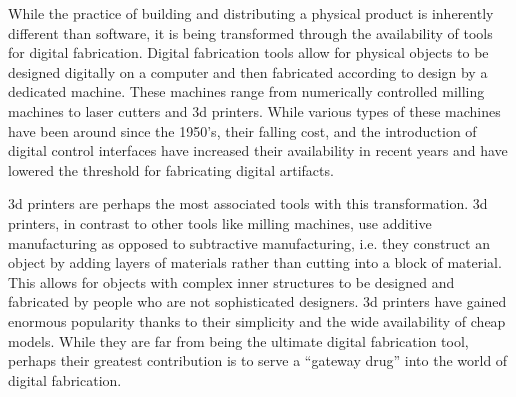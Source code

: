 While the practice of building and distributing a physical product is inherently different than software, it is being transformed through the availability of tools for digital fabrication. Digital fabrication tools allow for physical objects to be designed digitally on a computer and then fabricated according to design by a dedicated machine. These machines range from numerically controlled milling machines to laser cutters and 3d printers. While various types of these machines have been around since the 1950's, their falling cost, and the introduction of digital control interfaces have increased their availability in recent years and have lowered the threshold for fabricating digital artifacts.

 3d printers are perhaps the most associated tools with this transformation. 3d printers, in contrast to other tools like milling machines, use additive manufacturing as opposed to subtractive manufacturing, i.e. they construct an object by adding layers of materials rather than cutting into a block of material. This allows for objects with complex inner structures to be designed and fabricated by people who are not sophisticated designers. 3d printers have gained enormous popularity thanks to their simplicity and the wide availability of cheap models. While they are far from being the ultimate digital fabrication tool, perhaps their greatest contribution is to serve a ``gateway drug'' into the world of digital fabrication. 

